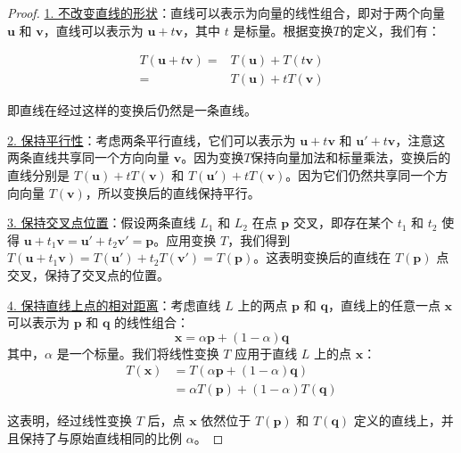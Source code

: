\begin{proof}

\underline{1. 不改变直线的形状}：直线可以表示为向量的线性组合，即对于两个向量 \(\boldsymbol{u}\) 和 \(\boldsymbol{v}\)，直线可以表示为 \(\boldsymbol{u} + t\boldsymbol{v}\)，其中 \(t\) 是标量。根据变换$T$的定义，我们有：

\begin{align*}
    T(\boldsymbol{u} + t\boldsymbol{v})
    = & T(\boldsymbol{u}) + T(t\boldsymbol{v})\\
    = & T(\boldsymbol{u}) + tT(\boldsymbol{v})
\end{align*}

即直线在经过这样的变换后仍然是一条直线。

\underline{2. 保持平行性}：考虑两条平行直线，它们可以表示为 \(\boldsymbol{u} + t\boldsymbol{v}\) 和 \(\boldsymbol{u}' + t\boldsymbol{v}\)，注意这两条直线共享同一个方向向量 \(\boldsymbol{v}\)。因为变换$T$保持向量加法和标量乘法，变换后的直线分别是 \(T(\boldsymbol{u}) + tT(\boldsymbol{v})\) 和 \(T(\boldsymbol{u}') + tT(\boldsymbol{v})\)。因为它们仍然共享同一个方向向量 \(T(\boldsymbol{v})\)，所以变换后的直线保持平行。

\underline{3. 保持交叉点位置}：假设两条直线 \(L_1\) 和 \(L_2\) 在点 \(\boldsymbol{p}\) 交叉，即存在某个 \(t_1\) 和 \(t_2\) 使得 \(\boldsymbol{u} + t_1\boldsymbol{v} = \boldsymbol{u}' + t_2\boldsymbol{v}' = \boldsymbol{p}\)。应用变换 \(T\)，我们得到 \(T(\boldsymbol{u} + t_1\boldsymbol{v}) = T(\boldsymbol{u}') + t_2T(\boldsymbol{v}') = T(\boldsymbol{p})\)。这表明变换后的直线在 \(T(\boldsymbol{p})\) 点交叉，保持了交叉点的位置。

\underline{4. 保持直线上点的相对距离}：考虑直线 \(L\) 上的两点 \(\boldsymbol{p}\) 和 \(\boldsymbol{q}\)，直线上的任意一点 \(\boldsymbol{x}\) 可以表示为 \(\boldsymbol{p}\) 和 \(\boldsymbol{q}\) 的线性组合：
\[ \boldsymbol{x} = \alpha\boldsymbol{p} + (1-\alpha)\boldsymbol{q} \]
其中，\(\alpha\) 是一个标量。我们将线性变换 \(T\) 应用于直线 \(L\) 上的点 \(\boldsymbol{x}\)：
\begin{align*}
    T(\boldsymbol{x}) 
    & = T(\alpha\boldsymbol{p} + (1-\alpha)\boldsymbol{q}) \\
    & = \alpha T(\boldsymbol{p}) + (1-\alpha)T(\boldsymbol{q})    
\end{align*}

这表明，经过线性变换 \(T\) 后，点 \(\boldsymbol{x}\) 依然位于 \(T(\boldsymbol{p})\) 和 \(T(\boldsymbol{q})\) 定义的直线上，并且保持了与原始直线相同的比例 \(\alpha\)。

\end{proof}

